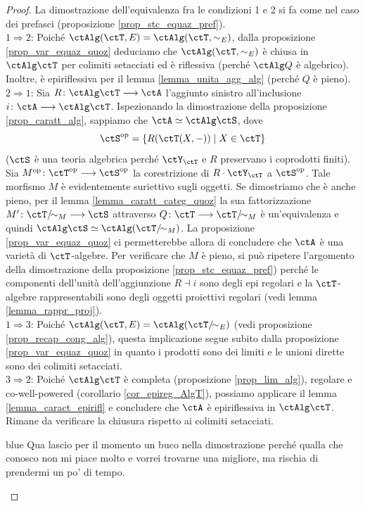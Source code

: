 \begin{proof}
 La dimostrazione dell'equivalenza fra le condizioni 1 e 2 si fa come nel caso dei prefasci (proposizione \ref{prop_stc_equaz_pref}). \\
 \(1 \Rightarrow 2\): Poiché \(\ctAlg(\ctT,E) = \ctAlg(\ctT,\sim_E)\), dalla proposizione \ref{prop_var_equaz_quoz}
 deduciamo che \(\ctAlg(\ctT,\sim_E)\) è chiusa in \(\ctAlg\ctT\) per colimiti setacciati ed è riflessiva (perché \(\ctAlg Q\) è
 algebrico). Inoltre, è epiriflessiva per il lemma \ref{lemma_unita_agg_alg} (perché \(Q\) è pieno). \\
 \(2 \Rightarrow 1\): Sia \(R \colon \ctAlg\ctT \fun \ctA\) l'aggiunto sinistro all'inclusione \(i \colon \ctA \fun \ctAlg\ctT\).
 Ispezionando la dimostrazione della proposizione \ref{prop_caratt_alg}, sappiamo che \(\ctA \simeq \ctAlg\ctS\), dove
 \[\ctS^{\op} = \{R(\ctT(X,-)) \mid X \in \ctT\}\]
 (\(\ctS\) è una teoria algebrica perché \(\ctY_\ctT\) e \(R\) preservano i coprodotti finiti). Sia \(M^{\op} \colon \ctT^{\op} \fun \ctS^{\op}\)
 la corestrizione di \(R \cmp \ctY_\ctT\) a \(\ctS^{\op}\). Tale morfismo \(M\) è evidentemente suriettivo sugli oggetti. Se dimostriamo che
 è anche pieno, per il lemma \ref{lemma_caratt_categ_quoz} la sua fattorizzazione \(M' \colon \ctT/{\!\sim_M} \fun \ctS\) attraverso
 \(Q \colon \ctT \fun \ctT/{\!\sim_M}\) è un'equivalenza e quindi \(\ctAlg\ctS \simeq \ctAlg(\ctT/{\!\sim_M})\). La proposizione
 \ref{prop_var_equaz_quoz} ci permetterebbe allora di concludere che \(\ctA\) è una varietà di \(\ctT\)-algebre. Per verificare che \(M\)
 è pieno, si può ripetere l'argomento della dimostrazione della proposizione \ref{prop_stc_equaz_pref}) perché le componenti
 dell'unità dell'aggiunzione \(R\dashv i\) sono degli epi regolari e la \(\ctT\)-algebre rappresentabili sono degli oggetti proiettivi regolari
 (vedi lemma \ref{lemma_rappr_proj}). \\
 \(1 \Rightarrow 3\): Poiché \(\ctAlg(\ctT,E) = \ctAlg(\ctT/{\!\sim_E})\) (vedi proposizione \ref{prop_recap_cong_alg}), questa implicazione
 segue subito dalla proposizione \ref{prop_var_equaz_quoz} in quanto i prodotti sono dei limiti e le unioni dirette sono dei colimiti setacciati. \\
 \(3 \Rightarrow 2\): Poiché \(\ctAlg\ctT\) è completa (proposizione \ref{prop_lim_alg}), regolare e co-well-powered  (corollario
 \ref{cor_epireg_AlgT}), possiamo applicare il lemma \ref{lemma_caract_epirifl} e concludere che \(\ctA\) è epiriflessiva in \(\ctAlg\ctT\).
 Rimane da verificare la chiusura rispetto ai colimiti setacciati. \\
 \begin{color}{blue}
  Qua lascio per il momento un buco nella dimostrazione perché qualla che conosco non mi piace molto e vorrei trovarne
  una migliore, ma rischia di prendermi un po' di tempo.
 \end{color}
\end{proof}

